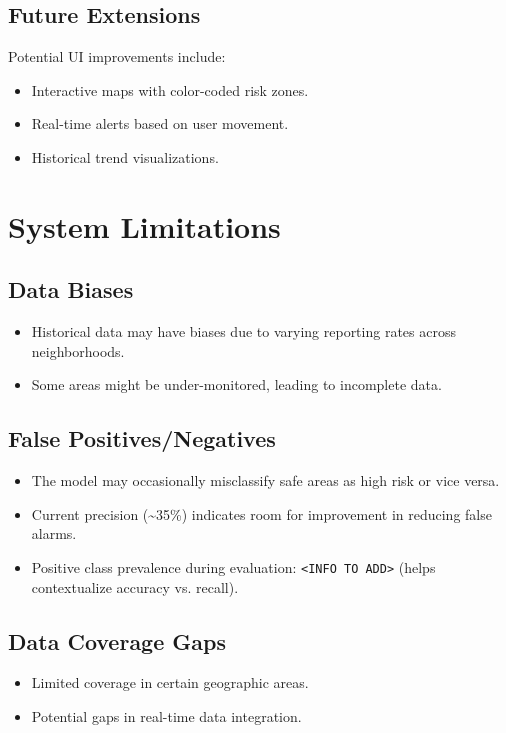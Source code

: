 \documentclass{article}
\begin{document}
\subsection{Future Extensions}
Potential UI improvements include:
\begin{itemize}
\item Interactive maps with color-coded risk zones.
\item Real-time alerts based on user movement.
\item Historical trend visualizations.
\end{itemize}

\section{System Limitations}

\subsection{Data Biases}
\begin{itemize}
\item Historical data may have biases due to varying reporting rates across neighborhoods.
\item Some areas might be under-monitored, leading to incomplete data.
\end{itemize}

\subsection{False Positives/Negatives}
\begin{itemize}
\item The model may occasionally misclassify safe areas as high risk or vice versa.
\item Current precision (\textasciitilde35\%) indicates room for improvement in reducing false alarms.
\item Positive class prevalence during evaluation: \texttt{<INFO TO ADD>} (helps contextualize accuracy vs. recall).
\end{itemize}

\subsection{Data Coverage Gaps}
\begin{itemize}
\item Limited coverage in certain geographic areas.
\item Potential gaps in real-time data integration.
\end{itemize}
\end{document}
